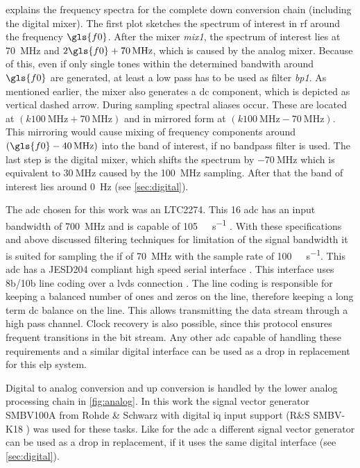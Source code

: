 \documentclass[12pt,a4paper,parskip=full,abstract=true,BCOR=12mm]{scrreprt}
\def\device#1{\mbox{\textit{#1}}}
\begin{document}
 explains the frequency spectra for the complete down
conversion chain (including the digital mixer). The first plot sketches the
spectrum of interest in \gls{rf} around the frequency $\gls{f0}$. After the mixer \device{mix1}, the
spectrum of interest lies at \SI{70}{\mega\hertz} and $2\gls{f0} + \SI{70}{\mega\hertz}$,
which is caused by the analog mixer. Because of this, even if only single tones
within the determined bandwith around $\gls{f0}$ are generated, at least a low pass
has to be used as filter \device{bp1}. As mentioned earlier, the mixer also generates a \gls{dc} component, which is depicted as vertical dashed arrow. During sampling spectral aliases occur. These
are located at $(k \SI{100}{\mega\hertz} + \SI{70}{\mega\hertz})$ and in mirrored form at
$(k \SI{100}{\mega\hertz} - \SI{70}{\mega\hertz})$. This mirroring would cause mixing
of frequency components around $(\gls{f0} - \SI{40}{\mega\hertz})$ into the band of interest,
if no bandpass filter is used. The last step is the digital mixer, which shifts
the spectrum by $\SI{-70}{\mega\hertz}$ which is equivalent to $\SI{+30}{\mega\hertz}$ caused by the \SI{100}{\mega\hertz} sampling. After that the band of interest lies around
\SI{0}{\hertz} (see \cref{sec:digital}).

The \gls{adc} chosen for this work was an LTC2274. This \SI{16}{\bit} \gls{adc}
has an input bandwidth of \SI{700}{\mega\hertz} and is capable of
\SI{105}{\mega\samples\per\second} \cite{ltc2274}. With these specifications and above discussed filtering techniques for limitation of the signal bandwidth it
is suited for sampling the \gls{if} of \SI{70}{\mega\hertz} with the sample rate
of \SI{100}{\mega\samples\per\second}. This \gls{adc} has a
JESD204 compliant high speed serial interface \cite{ltc2274}. This interface uses 8b/10b
line coding over a \gls{lvds} connection \cite{jesd205B.01}. The line coding
is responsible for keeping a balanced number of ones and zeros on the line, therefore keeping a long term
\gls{dc} balance on the line. This allows transmitting the data stream through a high pass
channel. Clock recovery is also possible, since this protocol ensures frequent transitions
in the bit stream. Any other \gls{adc} capable of handling
these requirements and a similar digital interface can be used as a drop in
replacement for this \gls{elp} system.

Digital to analog conversion and up conversion is handled by the lower analog
processing chain in \cref{fig:analog}. In this work the signal vector generator
SMBV100A from Rohde \& Schwarz with digital \gls{iq} input support (R\&S SMBV-K18
\cite{smbv_100a}) was used for these tasks. Like for the \gls{adc} a different
signal vector generator can be used as a drop in replacement, if it uses
the same digital interface (see \cref{sec:digital}).
\end{document}
